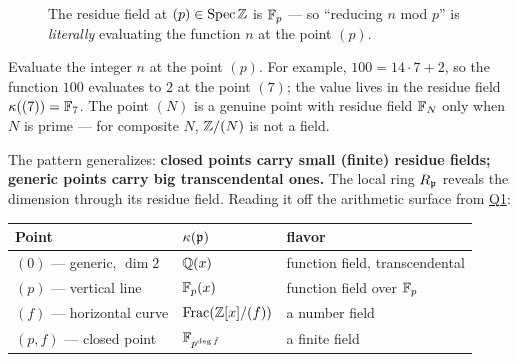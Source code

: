 \begin{figure}[h]
\centering
{}
\caption{The residue field at $(p)\in\operatorname{Spec}\mathbb{Z}$ is $\mathbb{F}_p$ --- so ``reducing $n$ mod
$p$'' is \emph{literally} evaluating the function $n$ at the point $(p)$.}
\end{figure}

\begin{intubox}[Try it]
Evaluate the integer $n$ at the point $(p)$. For example, $100 = 14\cdot 7 + 2$, so
the function $100$ evaluates to $2$ at the point $(7)$; the value lives in the residue
field $\kappa((7))=\mathbb{F}_7$. The point $(N)$ is a genuine point with residue field
$\mathbb{F}_N$ only when $N$ is prime --- for composite $N$, $\mathbb{Z}/(N)$ is not a field.
\end{intubox}

The pattern generalizes: \textbf{closed points carry small (finite) residue fields;
generic points carry big transcendental ones.} The local ring $R_{\mathfrak{p}}$ reveals the
dimension through its residue field. Reading it off the arithmetic surface from
\hyperref[sec:zx-draw]{Q1}:

\begin{center}
\begin{tabular}{@{}lll@{}}
\toprule
\textbf{Point} & $\kappa(\mathfrak{p})$ & \textbf{flavor}\\
\midrule
$(0)$ --- generic, $\dim 2$ & $\mathbb{Q}(x)$ & function field, transcendental\\
$(p)$ --- vertical line & $\mathbb{F}_p(x)$ & function field over $\mathbb{F}_p$\\
$(f)$ --- horizontal curve & $\operatorname{Frac}(\mathbb{Z}[x]/(f))$ & a number field\\
$(p,f)$ --- closed point & $\mathbb{F}_{p^{\deg\bar f}}$ & a finite field\\
\bottomrule
\end{tabular}
\end{center}

